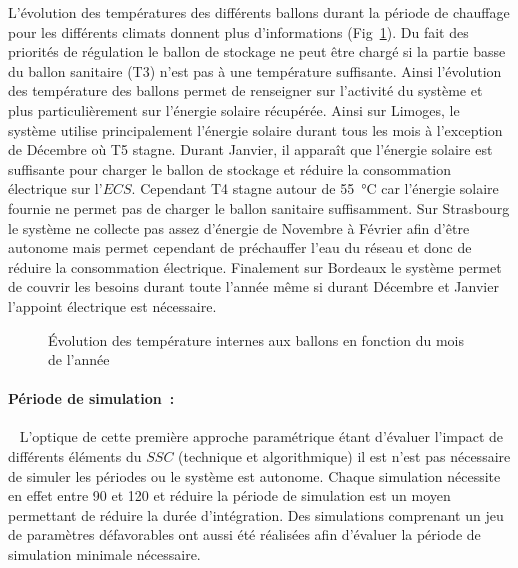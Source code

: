 L’évolution des températures des différents ballons durant la période de chauffage pour
les différents climats donnent plus d’informations (Fig~\ref{fig:temp_ballon_mensuel}). Du fait des priorités de régulation
le ballon de stockage ne peut être chargé si la partie basse du ballon sanitaire (T3)
n’est pas à une température suffisante. Ainsi l’évolution des température des ballons
permet de renseigner sur l’activité du système et plus particulièrement sur l’énergie solaire
récupérée. Ainsi sur Limoges, le système utilise principalement l’énergie solaire durant tous
les mois à l’exception de Décembre où T5 stagne. Durant Janvier, il apparaît que
l’énergie solaire est suffisante pour charger le ballon de stockage et réduire la
consommation électrique sur l’$ECS$. Cependant T4 stagne autour de \SI{55}{\celsius}
car l’énergie solaire fournie ne permet pas de charger le ballon sanitaire suffisamment.
Sur Strasbourg le système ne collecte pas assez d’énergie de Novembre à Février afin
d’être autonome mais permet cependant de préchauffer l’eau du réseau et donc de réduire
la consommation électrique. Finalement sur Bordeaux le système permet de couvrir les
besoins durant toute l’année même si durant Décembre et Janvier l’appoint électrique
est nécessaire.

\begin{figure}
    \begin{center}
    \end{center}
    \caption{Évolution des température internes aux ballons en fonction du mois
             de l’année \label{fig:temp_ballon_mensuel}}
\end{figure}


\paragraph{Période de simulation~:} %
\label{par:période_de_simulation}
~
L’optique de cette première approche paramétrique étant d’évaluer l’impact de différents
éléments du $SSC$ (technique et algorithmique) il est n’est pas nécessaire de simuler les
périodes ou le système est autonome. Chaque simulation nécessite en effet entre
\SI{90}{\min} et \SI{120}{\min} et réduire la période de simulation est un moyen
permettant de réduire la durée d’intégration. Des simulations comprenant un jeu de
paramètres défavorables ont aussi été réalisées afin d’évaluer la période de simulation
minimale nécessaire.

